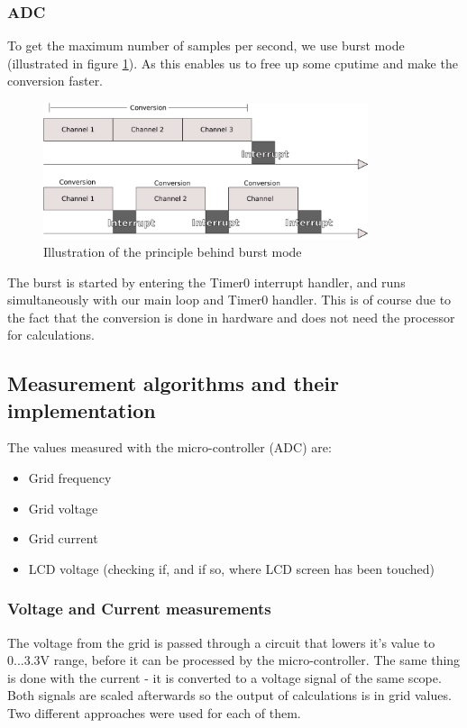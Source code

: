 \subsubsection{ADC}
To get the maximum number of samples per second, we use burst mode (illustrated in figure \ref{fig:burst_mode}). As this enables us to free up some cputime and make the conversion faster.
\begin{figure}[!h]
  \centering
  \includegraphics[width=0.85\textwidth]{figs/burst_mode.pdf}
  \caption{Illustration of the principle behind burst mode}
  \label{fig:burst_mode}
\end{figure}
The burst is started by entering the Timer0 interrupt handler, and runs simultaneously with our main loop and Timer0 handler. This is of course due to the fact that the conversion is done in hardware and does not need the processor for calculations.

\subsection{Measurement algorithms and their implementation}
The values measured with the micro-controller (ADC) are:
\begin{itemize}
\item Grid frequency
\item Grid voltage
\item Grid current
\item LCD voltage (checking if, and if so, where LCD screen has been touched)
\end{itemize}

\subsubsection{Voltage and Current measurements}
The voltage from the grid is passed through a circuit that lowers it's value to 0...3.3V range, before it can be processed by the micro-controller. The same thing is done with the current - it is converted to a voltage signal of the same scope. Both signals are scaled afterwards so the output of calculations is in grid values. Two different approaches were used for each of them.

